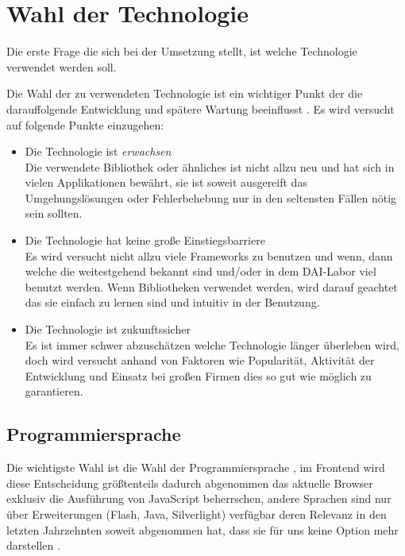 \documentclass[12pt,twoside]{book}
\begin{document}
\section{Wahl der Technologie}

Die erste Frage die sich bei der Umsetzung stellt, ist welche Technologie verwendet werden soll.

Die Wahl der zu verwendeten Technologie ist ein wichtiger Punkt der die darauffolgende Entwicklung und spätere Wartung beeinflusst \cite{graham2004beating}. Es wird versucht auf folgende Punkte einzugehen:

\begin{itemize}
  \item Die Technologie ist \textit{erwachsen} \\
  Die verwendete Bibliothek oder ähnliches ist nicht allzu neu und hat sich in vielen Applikationen bewährt, sie ist soweit ausgereift das Umgehungslösungen oder Fehlerbehebung nur in den seltensten Fällen nötig sein sollten.
  \item Die Technologie hat keine große Einstiegsbarriere \\
  Es wird versucht nicht allzu viele Frameworks zu benutzen und wenn, dann welche die weitestgehend bekannt sind und/oder in dem DAI-Labor viel benutzt werden. Wenn Bibliotheken verwendet werden, wird darauf geachtet das sie einfach zu lernen sind und intuitiv in der Benutzung.
  \item Die Technologie ist zukunftssicher \\
  Es ist immer schwer abzuschätzen welche Technologie länger überleben wird, doch wird versucht anhand von Faktoren wie Popularität, Aktivität der Entwicklung und Einsatz bei großen Firmen dies so gut wie möglich zu garantieren.
\end{itemize}

\subsection{Programmiersprache}

Die wichtigste Wahl ist die Wahl der Programmiersprache \cite{graham2004beating}, im Frontend wird diese Entscheidung größtenteils dadurch abgenommen das aktuelle Browser exklusiv die Ausführung von JavaScript beherrschen, andere Sprachen sind nur über Erweiterungen (Flash, Java, Silverlight) verfügbar deren Relevanz in den letzten Jahrzehnten soweit abgenommen hat, dass sie für uns keine Option mehr darstellen \cite{clientside}.
\end{document}

